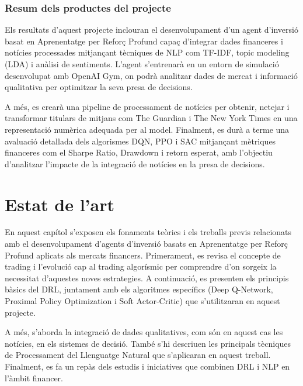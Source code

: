 \documentclass[12pt,a4paper,twoside]{book}
\begin{document}
\subsection{Resum dels productes del projecte}

Els resultats d'aquest projecte inclouran el desenvolupament d'un agent d'inversió basat en Aprenentatge per Reforç Profund capaç d'integrar dades financeres i notícies processades mitjançant tècniques de NLP com TF-IDF, topic modeling (LDA) i anàlisi de sentiments. L'agent s'entrenarà en un entorn de simulació desenvolupat amb OpenAI Gym, on podrà analitzar dades de mercat i informació qualitativa per optimitzar la seva presa de decisions.

A més, es crearà una pipeline de processament de notícies per obtenir, netejar i transformar titulars de mitjans com The Guardian i The New York Times en una representació numèrica adequada per al model. Finalment, es durà a terme una avaluació detallada dels algorismes DQN, PPO i SAC mitjançant mètriques financeres com el Sharpe Ratio, Drawdown i retorn esperat, amb l'objectiu d'analitzar l'impacte de la integració de notícies en la presa de decisions.


\chapter{Estat de l'art}

En aquest capítol s'exposen els fonaments teòrics i els treballs previs relacionats amb el desenvolupament d'agents d'inversió basats en Aprenentatge per Reforç Profund aplicats als mercats financers. Primerament, es revisa el concepte de trading i l'evolució cap al trading algorísmic per comprendre d'on sorgeix la necessitat d'aquestes noves estrategies. A continuació, es presenten els principis bàsics del DRL, juntament amb els algoritmes específics (Deep Q-Network, Proximal Policy Optimization i Soft Actor-Critic) que s'utilitzaran en aquest projecte.

A més, s'aborda la integració de dades qualitatives, com són en aquest cas les notícies, en els sistemes de decisió. També s'hi descriuen les principals tècniques de Processament del Llenguatge Natural que s'aplicaran en aquest treball. Finalment, es fa un repàs dels estudis i iniciatives que combinen DRL i NLP en l'àmbit financer.
\end{document}
